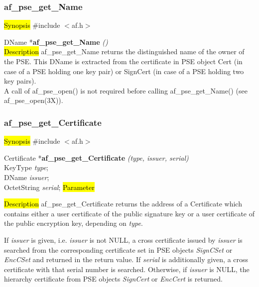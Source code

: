 \subsubsection{af\_pse\_get\_Name}
\label{af_get_Name}
\hl{Synopsis}
\#include $<$af.h$>$

DName *{\bf af\_pse\_get\_Name} {\em ()} \\
\hl{Description}
af\_pse\_get\_Name returns the distinguished name of the owner of the PSE. 
This DName is extracted from the certificate in PSE object Cert (in case of
a PSE holding one key pair) or SignCert (in case of a PSE holding two key pairs).
\\ [1em]
A call of af\_pse\_open() is not required before calling af\_pse\_get\_Name()
(see af\_pse\_open(3X)).

\subsubsection{af\_pse\_get\_Certificate}
\label{af_get_Certificate}
\hl{Synopsis}
\#include $<$af.h$>$

Certificate *{\bf af\_pse\_get\_Certificate} {\em (type, issuer, serial)} \\
KeyType {\em type}; \\
DName	{\em *issuer}; \\
OctetString	{\em *serial};
\hl{Parameter}



\hl{Description}
af\_pse\_get\_Certificate returns the address of a Certificate which contains
either a user certificate of the public signature key 
or a user certificate of the public encryption key, depending on {\em type}. 

If {\em issuer} is given, i.e. {\em issuer} is not NULL, a cross certificate issued
by {\em issuer} is searched from the corresponding certificate set in PSE objects 
{\em SignCSet} or {\em EncCSet} and returned in the return value. 
If {\em serial} is additionally given, a cross
certificate with that serial number is searched. Otherwise, if {\em issuer}
is NULL, the hierarchy certificate from PSE objects {\em SignCert} or {\em EncCert}
is returned.

